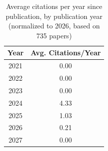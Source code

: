 \begin{table}[htbp]
\centering
\caption{Average citations per year since publication, by publication year (normalized to 2026, based on 735 papers)}
\label{tab:avg_citations_per_year_normalized}
\begin{tabular}{cc}
\toprule
Year & Avg. Citations/Year \\
\midrule
\rowcolor{white}
2021 & 0.00 \\
\rowcolor{gray!15}
2022 & 0.00 \\
\rowcolor{white}
2023 & 0.00 \\
\rowcolor{gray!15}
2024 & 4.33 \\
\rowcolor{white}
2025 & 1.03 \\
\rowcolor{gray!15}
2026 & 0.21 \\
\rowcolor{white}
2027 & 0.00 \\
\bottomrule
\end{tabular}
\end{table}